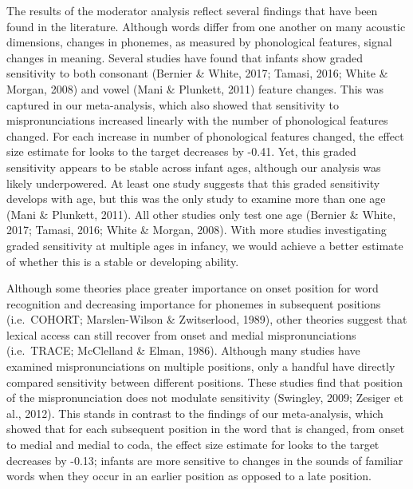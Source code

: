 \documentclass[man]{apa6}
\begin{document}
The results of the moderator analysis reflect several findings that have been found in the literature. Although words differ from one another on many acoustic dimensions, changes in phonemes, as measured by phonological features, signal changes in meaning. Several studies have found that infants show graded sensitivity to both consonant (Bernier \& White, 2017; Tamasi, 2016; White \& Morgan, 2008) and vowel (Mani \& Plunkett, 2011) feature changes. This was captured in our meta-analysis, which also showed that sensitivity to mispronunciations increased linearly with the number of phonological features changed. For each increase in number of phonological features changed, the effect size estimate for looks to the target decreases by -0.41. Yet, this graded sensitivity appears to be stable across infant ages, although our analysis was likely underpowered. At least one study suggests that this graded sensitivity develops with age, but this was the only study to examine more than one age (Mani \& Plunkett, 2011). All other studies only test one age (Bernier \& White, 2017; Tamasi, 2016; White \& Morgan, 2008). With more studies investigating graded sensitivity at multiple ages in infancy, we would achieve a better estimate of whether this is a stable or developing ability.

Although some theories place greater importance on onset position for word recognition and decreasing importance for phonemes in subsequent positions (i.e.~COHORT; Marslen-Wilson \& Zwitserlood, 1989), other theories suggest that lexical access can still recover from onset and medial mispronunciations (i.e.~TRACE; McClelland \& Elman, 1986). Although many studies have examined mispronunciations on multiple positions, only a handful have directly compared sensitivity between different positions. These studies find that position of the mispronunciation does not modulate sensitivity (Swingley, 2009; Zesiger et al., 2012). This stands in contrast to the findings of our meta-analysis, which showed that for each subsequent position in the word that is changed, from onset to medial and medial to coda, the effect size estimate for looks to the target decreases by -0.13; infants are more sensitive to changes in the sounds of familiar words when they occur in an earlier position as opposed to a late position.
\end{document}
